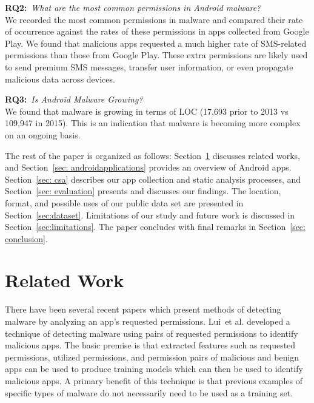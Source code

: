 \documentclass{sig-alternate}
\newcommand{\todo}[1]{\textcolor{cyan}{\textbf{[#1]}}}
\begin{document}
\textbf{RQ2:}~\emph{What are the most common permissions in Android malware?}\\
We recorded the most common permissions in malware and compared their rate of occurrence against the rates of these permissions in apps collected from Google Play. We found that malicious apps requested a much higher rate of SMS-related permissions than those from Google Play. These extra permissions are likely used to send premium SMS messages, transfer user information, or even propagate malicious data across devices.

\textbf{RQ3:}~\emph{Is Android Malware Growing?}\\
We found that malware is growing in terms of LOC (17,693 prior to 2013 vs 109,947 in 2015). This is an indication that malware is becoming more complex on an ongoing basis.

The rest of the paper is organized as follows: Section~\ref{sec: relatedwork} discusses related works, and Section~\ref{sec: androidapplications} provides an overview of Android apps. Section~\ref{sec: csa} describes our app collection and static analysis processes, and Section~\ref{sec: evaluation} presents and discusses our findings. The location, format, and possible uses of our public data set are presented in Section~\ref{sec:dataset}. Limitations of our study and future work is discussed in Section~\ref{sec:limitations}. The paper concludes with final remarks in Section~\ref{sec: conclusion}.



\section{Related Work}
\label{sec: relatedwork}


There have been several recent papers which present methods of detecting malware by analyzing an app's requested permissions. Lui~et al.\cite{Liu:2014:TPA:2634434.2635084} developed a technique of detecting malware using pairs of requested permissions to identify malicious apps. The basic premise is that extracted features such as requested permissions, utilized permissions, and permission pairs of malicious and benign apps can be used to produce training models which can then be used to identify malicious apps. A primary benefit of this technique is that previous examples of specific types of malware do not necessarily need to be used as a training set.
\end{document}
